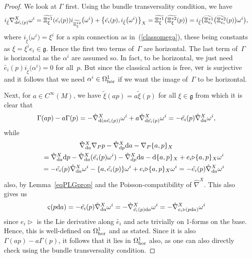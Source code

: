 \documentclass[10pt,a4paper]{amsart}
\numberwithin{equation}{section}
\newcommand{\<}{{\langle}}
\renewcommand{\>}{{\rangle}}
\newcommand{\extd}{{\rm d}}
\newcommand{\la}{{\triangleright}}
\newcommand{\cg}{{\mathfrak{g}}}
\newcommand{\ver}{{\rm ver}}
\begin{document}
\begin{proof} We look at $\Gamma$ first. Using the bundle transversality condition, we have
\[ i_{\tilde\xi}\nabla^X_{\extd \tilde{e_i}(p)}\omega^i=\widetilde{\Xi_\xi^{*1}}(\tilde{e_i}(p)) i_{\widetilde{\Xi_\xi^{*2}}}\big(\omega^i\big)+\big\{\tilde{e_i}(p),i_{\tilde\xi}\big(\omega^i\big)\big\}_X =\widetilde{\Xi_\xi^{*1}}\big({\widetilde{\Xi_\xi^{*2}}}(p)\big)=i_{\tilde\xi}\big(\widetilde{\Xi_{e_i}^{*1}} \big({\widetilde{\Xi_{e_i}^{*2}}}(p)\big)\omega^i\big),\]
where $i_{\tilde\xi}\big(\omega^i\big)=\xi^i$ for a spin connection as in~(\ref{classomega}), these being constants as $\xi=\xi^ie_i\in\cg$. Hence the first two terms of~$\Gamma$ are horizontal. The last term of~$\Gamma$ is horizontal as the $\alpha^i$ are assumed so. In fact, to be horizontal, we just need $\tilde{e_i}(p)i_{\tilde\xi}\big(\alpha^i\big)=0$ for all~$p$. But since the classical action is free, $\ver$ is surjective and it follows that we need $\alpha^i\in \Omega^1_{\rm hor}$ if we want the image of~$\Gamma$ to be horizontal.

Next, for $a\in C^\infty(M)$, we have $\tilde\xi(ap)=a\tilde\xi(p)$ for all $\xi\in \cg$ from which it is clear that
\[ \Gamma(ap)-a\Gamma(p)=-\hat\nabla^X_{\extd(a\tilde{e_i}(p))}\omega^i+a\hat\nabla^X_{\extd\tilde{e_i}(p)}\omega^i=-\tilde{e_i}(p)\hat\nabla^X_{\extd a}\omega^i,\]
while
\begin{gather*}\hat\nabla^X_{\extd a}\nabla_Pp-\hat\nabla^X_{\extd p}\extd a -\nabla_P\{a,p\}_X\\
\qquad{} =\hat\nabla^X_{\extd a}\extd p-\hat\nabla^X_{\extd a}(\tilde{e_i}(p)\omega^i)-\hat\nabla^X_{\extd p}\extd a-\extd\{a,p\}_X+e_i\la\{a,p\}_X\omega^i\\
\qquad{} =-\tilde{e_i}(p)\hat\nabla^X_{\extd a}\omega^i-\{a,\tilde{e_i}(p)\}\omega^i +e_i\la\{a,p\}_X\omega^i=-\tilde{e_i}(p)\hat\nabla^X_{\extd a}\omega^i\end{gather*}
also, by Lemma~\ref{eqPLGprop} and the Poisson-compatibility of $\hat\nabla^X$. This also gives us \[ \varsigma(p\extd a) =-\tilde{e_i}(p)\hat\nabla^X_{\extd a}\omega^i =-\hat\nabla^X_{\tilde{e_i}(p)\extd a}\omega^i =-\hat\nabla^X_{e_i\la(p\extd a)}\omega^i\]
since $e_i\la$ is the Lie derivative along $\tilde{e_i}$ and acts trivially on 1-forms on the base. Hence, this is well-defined on $\Omega^1_{\rm hor}$ and as stated. Since it is also $\Gamma(ap)-a\Gamma(p)$, it follows that it lies in $\Omega^1_{\rm hor}$ also, as one can also directly check using the bundle transversality condition.


\end{proof}
\end{document}
